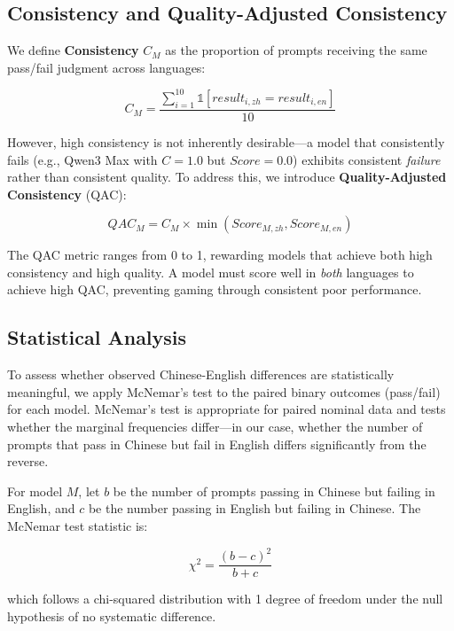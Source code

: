 \documentclass[11pt,a4paper]{article}
\begin{document}
\subsection{Consistency and Quality-Adjusted Consistency}

We define \textbf{Consistency} $C_M$ as the proportion of prompts receiving the same pass/fail judgment across languages:

\begin{equation}
    C_M = \frac{\sum_{i=1}^{10} \mathbb{1}[result_{i,zh} = result_{i,en}]}{10}
\end{equation}

However, high consistency is not inherently desirable---a model that consistently fails (e.g., Qwen3 Max with $C = 1.0$ but $Score = 0.0$) exhibits consistent \textit{failure} rather than consistent quality. To address this, we introduce \textbf{Quality-Adjusted Consistency} (QAC):

\begin{equation}
    QAC_M = C_M \times \min(Score_{M,zh}, Score_{M,en})
\end{equation}

The QAC metric ranges from 0 to 1, rewarding models that achieve both high consistency and high quality. A model must score well in \textit{both} languages to achieve high QAC, preventing gaming through consistent poor performance.

\subsection{Statistical Analysis}

To assess whether observed Chinese-English differences are statistically meaningful, we apply McNemar's test \citep{mcnemar1947} to the paired binary outcomes (pass/fail) for each model. McNemar's test is appropriate for paired nominal data and tests whether the marginal frequencies differ---in our case, whether the number of prompts that pass in Chinese but fail in English differs significantly from the reverse.

For model $M$, let $b$ be the number of prompts passing in Chinese but failing in English, and $c$ be the number passing in English but failing in Chinese. The McNemar test statistic is:

\begin{equation}
    \chi^2 = \frac{(b - c)^2}{b + c}
\end{equation}

which follows a chi-squared distribution with 1 degree of freedom under the null hypothesis of no systematic difference.
\end{document}
